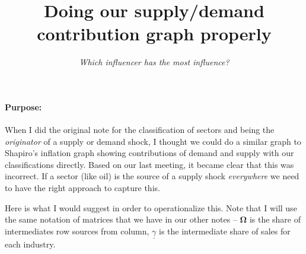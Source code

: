 \documentclass[12pt,english]{article}
\newcommand{\hlight}[1]{\textcolor{org}{#1}}
\begin{document}


\title{Doing our supply/demand contribution graph properly}
\author{{\emph{Which influencer has the most influence?}}}
\maketitle

\paragraph{Purpose:} When I did the original note for the classification of sectors and being the \emph{originator} of a supply or demand shock, I thought we could do a similar graph to Shapiro's inflation graph showing contributions of demand and supply with our classifications directly. Based on our last meeting, it became clear that this was incorrect. If a sector (like oil) is the source of a supply shock \emph{everywhere} we need to have the right approach to capture this.

Here is what I would suggest in order to operationalize this. \hlight{Note that I will use the same notation of matrices that we have in our other notes -- $\mathbold{\Omega}$ is the share of intermediates row sources from column, $\underline{\gamma}$ is the intermediate share of sales for each industry.}
\end{document}
